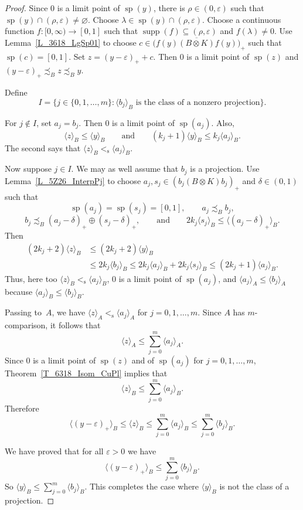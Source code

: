 \documentclass[10pt]{amsart}
\numberwithin{equation}{section}
\theoremstyle{definition}
\newcommand{\dt}{\delta}
\newcommand{\ep}{\varepsilon}
\newcommand{\ld}{\lambda}
\newcommand{\rh}{\rho}
\newcommand{\spec}{{\operatorname{sp}}}
\newcommand{\supp}{{\operatorname{supp}}}
\newcommand{\andeqn}{\qquad {\mbox{and}} \qquad}
\newcommand{\pj}{projection}
\newcommand{\cfn}{continuous function}
\renewcommand{\S}{\subseteq}
\newcommand{\I}{\infty}
\newcommand{\E}{\varnothing}
\newcommand{\cc}[1]{\langle #1 \rangle}
\newcommand{\ccA}[1]{\langle #1 \rangle_A}
\newcommand{\ccB}[1]{\langle #1 \rangle_B}
\newcommand{\les}{<_{\operatorname{s}}}
\begin{document}
\begin{proof}
Since $0$ is a limit point of $\spec (y)$,
there is $\rh \in (0, \ep)$ such that
$\spec (y) \cap (\rh, \ep) \neq \E$.
Choose $\ld \in \spec (y) \cap (\rh, \ep)$.
Choose a \cfn{} $f \colon [0, \I) \to [0, 1]$ such that
$\supp (f) \S (\rh, \ep)$ and $f (\ld) \neq 0$.
Use Lemma~\ref{L_3618_LgSp01} to choose
$c \in \bigl( {\overline{f (y) (B \otimes K) f (y)}} \bigr)_{+}$
such that $\spec (c) = [0, 1]$.
Set $z = (y - \ep)_{+} + c$.
Then $0$ is a limit point of $\spec (z)$ and
$(y - \ep)_{+} \precsim_B z \precsim_B y$.

Define
\[
I = \bigl\{ j \in \{0, 1, \ldots, m\} \colon
 {\mbox{$\cc{b_j}_B$ is the class of a nonzero projection}} \bigr\}.
\]

For $j \not\in I$, set $a_j = b_j$.
Then $0$ is a limit point of $\spec (a_j)$.
Also,
\[
\ccB{z} \leq \ccB{y}
\andeqn
(k_j + 1) \ccB{y} \leq k_j \ccB{a_j}.
\]
The second says that $\ccB{z} \les \ccB{a_j}$.

Now suppose $j \in I$.
We may as well assume that $b_j$ is a \pj.
Use Lemma~\ref{L_5Z26_InterpPj} to choose
$a_j, s_j \in (b_j (B \otimes K) b_j)_{+}$ and $\dt \in (0, 1)$
such that
\[
\spec (a_j) = \spec (s_j) = [0, 1],
\qquad
a_j \precsim_B b_j,
\]
\[
b_j \precsim_B (a_j - \dt)_{+} \oplus (s_j - \dt)_{+},
\qquad {\mbox{and}} \qquad
2 k_j \ccB{s_j} \leq \ccB{(a_j - \dt)_{+}}.
\]
Then
\[
\begin{split}
(2 k_j + 2) \ccB{z}
& \leq (2 k_j + 2) \ccB{y}
\\
& \leq 2 k_j \ccB{b_j}
  \leq 2 k_j \ccB{a_j} + 2 k_j \ccB{s_j}
  \leq (2 k_j + 1) \ccB{a_j}.
\end{split}
\]
Thus, here too $\ccB{z} \les \ccB{a_j}$,
$0$ is a limit point of $\spec (a_j)$,
and $\ccA{a_j} \leq \ccA{b_j}$ because $\ccB{a_j} \leq \ccB{b_j}$.

Passing to~$A$, we have
$\ccA{z} \les \ccA{a_j}$ for $j = 0, 1, \ldots, m$.
Since $A$ has $m$-comparison,
it follows that
\[
\ccA{z} \leq \sum_{j = 0}^m \ccA{a_j}.
\]
Since $0$ is a limit point of $\spec (z)$
and of $\spec (a_j)$ for $j = 0, 1, \ldots, m$,
Theorem~\ref{T_6318_Isom_CuPl} implies that
\[
\ccB{z} \leq \sum_{j = 0}^m \ccB{a_j}.
\]
Therefore
\[
\ccB{(y - \ep)_{+}}
 \leq \ccB{z}
 \leq \sum_{j = 0}^m \ccB{a_j}
 \leq \sum_{j = 0}^m \ccB{b_j}.
\]

We have proved that for all $\ep > 0$ we have
\[
\ccB{(y - \ep)_{+}} \leq \sum_{j = 0}^m \ccB{b_j}.
\]
So $\ccB{y} \leq \sum_{j = 0}^m \ccB{b_j}$.
This completes the case where $\ccB{y}$ is not the class of a \pj.


\end{proof}
\end{document}
